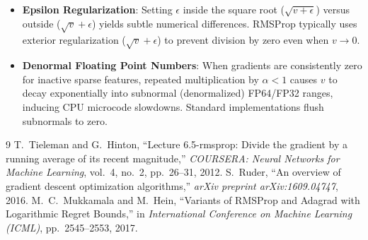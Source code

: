 \documentclass[11pt,a4paper]{article}
\theoremstyle{definition}
\begin{document}
\begin{itemize}
    \item \textbf{Epsilon Regularization}: Setting $\epsilon$ inside the square root ($\sqrt{v + \epsilon}$) versus outside ($\sqrt{v} + \epsilon$) yields subtle numerical differences. RMSProp typically uses exterior regularization ($\sqrt{v} + \epsilon$) to prevent division by zero even when $v \to 0$.
    \item \textbf{Denormal Floating Point Numbers}: When gradients are consistently zero for inactive sparse features, repeated multiplication by $\alpha < 1$ causes $v$ to decay exponentially into subnormal (denormalized) FP64/FP32 ranges, inducing CPU microcode slowdowns. Standard implementations flush subnormals to zero.
\end{itemize}

\begin{thebibliography}{9}
 T.~Tieleman and G.~Hinton, ``Lecture 6.5-rmsprop: Divide the gradient by a running average of its recent magnitude,'' \emph{COURSERA: Neural Networks for Machine Learning}, vol.~4, no.~2, pp.~26--31, 2012.
 S.~Ruder, ``An overview of gradient descent optimization algorithms,'' \emph{arXiv preprint arXiv:1609.04747}, 2016.
 M.~C.~Mukkamala and M.~Hein, ``Variants of RMSProp and Adagrad with Logarithmic Regret Bounds,'' in \emph{International Conference on Machine Learning (ICML)}, pp.~2545--2553, 2017.
\end{thebibliography}
\end{document}
